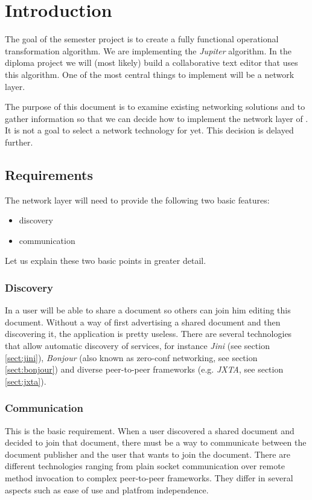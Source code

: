 \section{Introduction}
The goal of the semester project is to create a fully functional operational transformation algorithm. We are implementing the \emph{Jupiter} algorithm. In the diploma project we will (most likely) build a collaborative text editor that uses this algorithm. One of the most central things to implement will be a network layer. 

The purpose of this document is to examine existing networking solutions and to gather information so that we can decide how to implement the network layer of \ace. It is not a goal to select a network technology for \ace yet. This decision is delayed further. 


\subsection{Requirements}
\label{sect:requirements}
The network layer will need to provide the following two basic features:

\begin{itemize}
 \item discovery
 \item communication
\end{itemize}

Let us explain these two basic points in greater detail.

\subsubsection{Discovery}
In \ace a user will be able to share a document so others can join him editing this document. Without a way of first advertising a shared document and then discovering it, the application is pretty useless. There are several technologies that allow automatic discovery of services, for instance \emph{Jini} (see section \ref{sect:jini}), \emph{Bonjour} (also known as zero-conf networking, see section \ref{sect:bonjour}) and diverse peer-to-peer frameworks (e.g. \emph{JXTA}, see section \ref{sect:jxta}).

\subsubsection{Communication}
This is the basic requirement. When a user discovered a shared document and decided to join that document, there must be a way to communicate between the document publisher and the user that wants to join the document. There are different technologies ranging from plain socket communication over remote method invocation to complex peer-to-peer frameworks. They differ in several aspects such as ease of use and platfrom independence.

